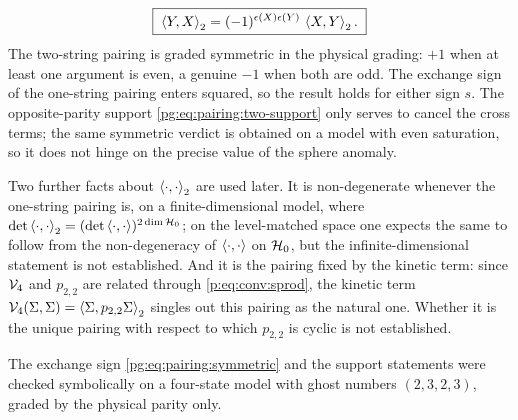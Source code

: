 \begin{equation}
  \label{pg:eq:pairing:symmetric}
  \boxed{\;
  \braket{Y, X}_2
    = (-1)^{\epsilon(X) \epsilon(Y)} \, \braket{X, Y}_2 .
  \;}
\end{equation}
The two-string pairing is graded symmetric in the physical grading: $+1$ when at least one argument is even, a genuine $-1$ when both are odd.
The exchange sign of the one-string pairing enters squared, so the result holds for either sign $s$.
The opposite-parity support \eqref{pg:eq:pairing:two-support} only serves to cancel the cross terms; the same symmetric verdict is obtained on a model with even saturation, so it does not hinge on the precise value of the sphere anomaly.

Two further facts about $\braket{\cdot,\cdot}_2$ are used later.
It is non-degenerate whenever the one-string pairing is, on a finite-dimensional model, where $\det\braket{\cdot,\cdot}_2=(\det\braket{\cdot,\cdot})^{2\dim{\mathcal{H}}_0}$; on the level-matched space one expects the same to follow from the non-degeneracy of $\braket{\cdot,\cdot}$ on ${\mathcal{H}}_0$, but the infinite-dimensional statement is not established.
And it is the pairing fixed by the kinetic term: since ${\mathcal{V}}_4$ and $p_{2,2}$ are related through \eqref{p:eq:conv:sprod}, the kinetic term ${\mathcal{V}}_4(\Sigma,\Sigma)=\braket{\Sigma,p_{2,2}\Sigma}_2$ singles out this pairing as the natural one.
Whether it is the unique pairing with respect to which $p_{2,2}$ is cyclic is not established.

The exchange sign \eqref{pg:eq:pairing:symmetric} and the support statements were checked symbolically on a four-state model with ghost numbers $(2,3,2,3)$, graded by the physical parity only.


